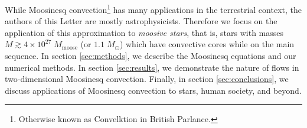 While Moosinesq convection\footnote{Otherwise known as Convelktion in British Parlance.} has many applications in the terrestrial context, the authors of this Letter are mostly astrophysicists.
Therefore we focus on the application of this approximation to \emph{moosive stars}, that is, stars with masses $M \gtrsim 4\times 10^{27} \; M_\mathrm{moose}$ (or $1.1 \; M_\odot$) which have convective cores while on the main sequence.
In section \ref{sec:methods}, we describe the Moosinesq equations and our numerical methods.
In section \ref{sec:results}, we demonstrate the nature of flows in two-dimensional Moosinesq convection.
Finally, in section \ref{sec:conclusions}, we discuss applications of Moosinesq convection to stars, human society, and beyond.
